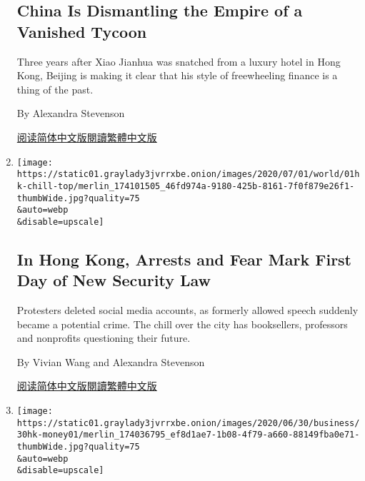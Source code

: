 \begin{enumerate}
{  \subsection{China Is Dismantling the Empire of a Vanished
  Tycoon}\label{china-is-dismantling-the-empire-of-a-vanished-tycoon}}

  Three years after Xiao Jianhua was snatched from a luxury hotel in
  Hong Kong, Beijing is making it clear that his style of freewheeling
  finance is a thing of the past.

  By Alexandra Stevenson

  \href{https://cn.nytimes3xbfgragh.onion/business/20200720/china-xiao-jianhua/}{阅读简体中文版}\href{https://cn.nytimes3xbfgragh.onion/business/20200720/china-xiao-jianhua/zh-hant/}{閱讀繁體中文版}
\item
  \href{/2020/07/01/world/asia/hong-kong-security-law-china.html}{}

  \texttt{[image: https://static01.graylady3jvrrxbe.onion/images/2020/07/01/world/01hk-chill-top/merlin\_174101505\_46fd974a-9180-425b-8161-7f0f879e26f1-thumbWide.jpg?quality=75\\\&auto=webp\\\&disable=upscale]}

  \hypertarget{in-hong-kong-arrests-and-fear-mark-first-day-of-new-security-law}{%
  \subsection{In Hong Kong, Arrests and Fear Mark First Day of New
  Security
  Law}\label{in-hong-kong-arrests-and-fear-mark-first-day-of-new-security-law}}

  Protesters deleted social media accounts, as formerly allowed speech
  suddenly became a potential crime. The chill over the city has
  booksellers, professors and nonprofits questioning their future.

  By Vivian Wang and Alexandra Stevenson

  \href{https://cn.nytimes3xbfgragh.onion/china/20200702/hong-kong-security-law-china/}{阅读简体中文版}\href{https://cn.nytimes3xbfgragh.onion/china/20200702/hong-kong-security-law-china/zh-han}{閱讀繁體中文版}
\item
  \href{/2020/06/30/business/china-hong-kong-security-law-business.html}{}

  \texttt{[image: https://static01.graylady3jvrrxbe.onion/images/2020/06/30/business/30hk-money01/merlin\_174036795\_ef8d1ae7-1b08-4f79-a660-88149fba0e71-thumbWide.jpg?quality=75\\\&auto=webp\\\&disable=upscale]}


\end{enumerate}
